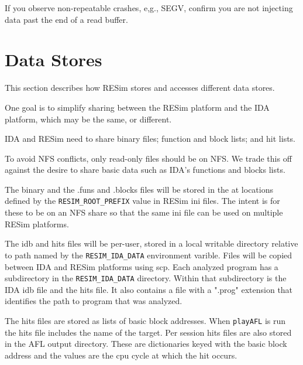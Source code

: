 \documentclass[titlepage]{article}
\begin{document}
If you observe non-repeatable crashes, e,g., SEGV, confirm you are not injecting data past the end of a read buffer.

\section{Data Stores}
This section describes how RESim stores and accesses different data stores.

One goal is to simplify sharing between the RESim platform and the IDA platform,
which may be the same, or different.

IDA and RESim need to share binary files; function and block lists; and hit lists.

To avoid NFS conflicts, only read-only files should be on NFS. We trade this off against
the desire to share basic data such as IDA's functions and blocks lists.  

The binary and the .funs and .blocks files will be stored in the at locations defined
by the {\tt RESIM\_ROOT\_PREFIX} value in RESim ini files.  The intent is for these to
be on an NFS share so that the same ini file can be used on multiple RESim platforms.

The idb and hits files will be per-user, stored in a local writable directory relative to path 
named by the {\tt RESIM\_IDA\_DATA} environment varible.  Files will be copied between IDA
and RESim platforms using scp. Each analyzed program has a subdirectory in the {\tt RESIM\_IDA\_DATA}
directory.  Within that subdirectory is the IDA idb file and the hits file.  It also contains
a file with a ".prog" extension that identifies the path to program that was analyzed. 

The hits files are stored as lists of basic block addresses.  When {\tt playAFL} is run the hits
file includes the name of the target.  Per session hits files are also stored in the AFL output
directory.  These are dictionaries keyed with the basic block address and the values are the
cpu cycle at which the hit occurs.
\end{document}

